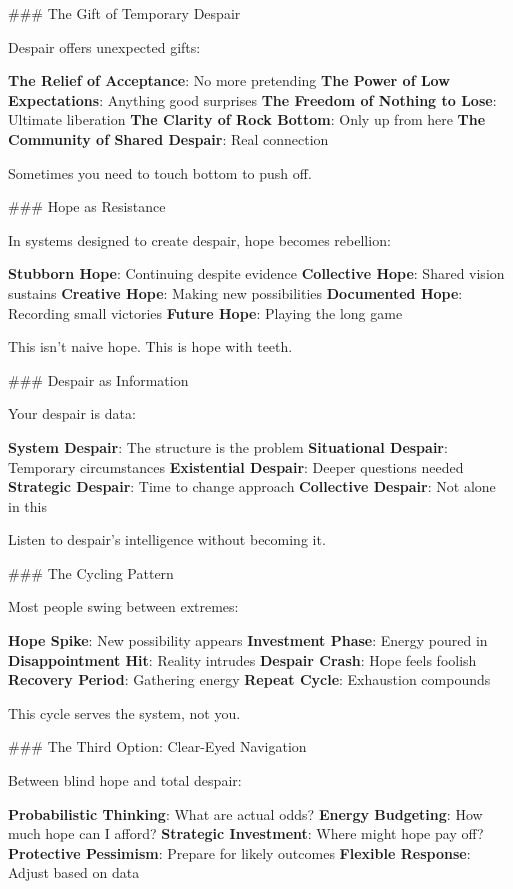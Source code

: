 \documentclass[12pt]{book}
\begin{document}
\#\#\# The Gift of Temporary Despair

Despair offers unexpected gifts:

\textbf{The Relief of Acceptance}: No more pretending
\textbf{The Power of Low Expectations}: Anything good surprises
\textbf{The Freedom of Nothing to Lose}: Ultimate liberation
\textbf{The Clarity of Rock Bottom}: Only up from here
\textbf{The Community of Shared Despair}: Real connection

Sometimes you need to touch bottom to push off.

\#\#\# Hope as Resistance

In systems designed to create despair, hope becomes rebellion:

\textbf{Stubborn Hope}: Continuing despite evidence
\textbf{Collective Hope}: Shared vision sustains
\textbf{Creative Hope}: Making new possibilities
\textbf{Documented Hope}: Recording small victories
\textbf{Future Hope}: Playing the long game

This isn't naive hope. This is hope with teeth.

\#\#\# Despair as Information

Your despair is data:

\textbf{System Despair}: The structure is the problem
\textbf{Situational Despair}: Temporary circumstances
\textbf{Existential Despair}: Deeper questions needed
\textbf{Strategic Despair}: Time to change approach
\textbf{Collective Despair}: Not alone in this

Listen to despair's intelligence without becoming it.

\#\#\# The Cycling Pattern

Most people swing between extremes:

\textbf{Hope Spike}: New possibility appears
\textbf{Investment Phase}: Energy poured in
\textbf{Disappointment Hit}: Reality intrudes
\textbf{Despair Crash}: Hope feels foolish
\textbf{Recovery Period}: Gathering energy
\textbf{Repeat Cycle}: Exhaustion compounds

This cycle serves the system, not you.

\#\#\# The Third Option: Clear-Eyed Navigation

Between blind hope and total despair:

\textbf{Probabilistic Thinking}: What are actual odds?
\textbf{Energy Budgeting}: How much hope can I afford?
\textbf{Strategic Investment}: Where might hope pay off?
\textbf{Protective Pessimism}: Prepare for likely outcomes
\textbf{Flexible Response}: Adjust based on data
\end{document}
